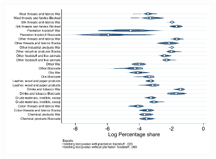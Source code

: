 \documentclass[12pt,a4paper,notitlepage,english]{article}
\begin{document}
\begin{figure}
\includegraphics[scale=.63]{revolutionary_block_distribution_X}
\end{figure}
\end{document}
